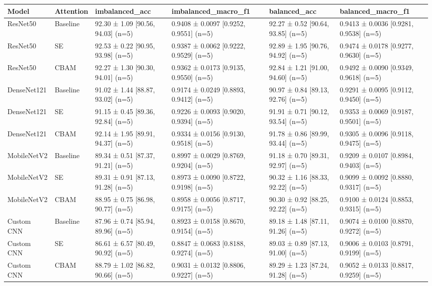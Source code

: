 \begin{tabular}{llllll}
\toprule
Model & Attention & imbalanced\_acc & imbalanced\_macro\_f1 & balanced\_acc & balanced\_macro\_f1 \\
\midrule
ResNet50 & Baseline & 92.30 ± 1.09 [90.56, 94.03] (n=5) & 0.9408 ± 0.0097 [0.9252, 0.9551] (n=5) & 92.27 ± 0.52 [90.64, 93.85] (n=5) & 0.9413 ± 0.0036 [0.9281, 0.9538] (n=5) \\
ResNet50 & SE & 92.53 ± 0.22 [90.95, 93.98] (n=5) & 0.9387 ± 0.0062 [0.9222, 0.9529] (n=5) & 92.89 ± 1.95 [90.76, 94.92] (n=5) & 0.9474 ± 0.0178 [0.9277, 0.9630] (n=5) \\
ResNet50 & CBAM & 92.27 ± 1.30 [90.30, 94.01] (n=5) & 0.9362 ± 0.0173 [0.9135, 0.9550] (n=5) & 92.84 ± 1.21 [91.00, 94.60] (n=5) & 0.9492 ± 0.0090 [0.9349, 0.9618] (n=5) \\
DenseNet121 & Baseline & 91.02 ± 1.44 [88.87, 93.02] (n=5) & 0.9174 ± 0.0249 [0.8893, 0.9412] (n=5) & 90.97 ± 0.84 [89.13, 92.76] (n=5) & 0.9291 ± 0.0095 [0.9112, 0.9450] (n=5) \\
DenseNet121 & SE & 91.15 ± 0.45 [89.36, 92.84] (n=5) & 0.9226 ± 0.0093 [0.9020, 0.9394] (n=5) & 91.91 ± 0.71 [90.12, 93.54] (n=5) & 0.9353 ± 0.0069 [0.9187, 0.9501] (n=5) \\
DenseNet121 & CBAM & 92.14 ± 1.95 [89.91, 94.37] (n=5) & 0.9334 ± 0.0156 [0.9130, 0.9518] (n=5) & 91.78 ± 0.86 [89.99, 93.44] (n=5) & 0.9305 ± 0.0096 [0.9118, 0.9475] (n=5) \\
MobileNetV2 & Baseline & 89.34 ± 0.51 [87.37, 91.21] (n=5) & 0.8997 ± 0.0029 [0.8769, 0.9204] (n=5) & 91.18 ± 0.70 [89.31, 92.97] (n=5) & 0.9209 ± 0.0107 [0.8984, 0.9403] (n=5) \\
MobileNetV2 & SE & 89.31 ± 0.91 [87.13, 91.28] (n=5) & 0.8973 ± 0.0090 [0.8722, 0.9198] (n=5) & 90.32 ± 1.16 [88.33, 92.22] (n=5) & 0.9099 ± 0.0092 [0.8880, 0.9317] (n=5) \\
MobileNetV2 & CBAM & 88.95 ± 0.75 [86.98, 90.77] (n=5) & 0.8958 ± 0.0056 [0.8717, 0.9175] (n=5) & 90.30 ± 0.92 [88.25, 92.22] (n=5) & 0.9100 ± 0.0124 [0.8853, 0.9315] (n=5) \\
Custom CNN & Baseline & 87.96 ± 0.74 [85.94, 89.96] (n=5) & 0.8923 ± 0.0158 [0.8670, 0.9154] (n=5) & 89.18 ± 1.48 [87.11, 91.26] (n=5) & 0.9074 ± 0.0100 [0.8870, 0.9272] (n=5) \\
Custom CNN & SE & 86.61 ± 6.57 [80.49, 90.92] (n=5) & 0.8847 ± 0.0683 [0.8188, 0.9274] (n=5) & 89.03 ± 0.89 [87.13, 91.00] (n=5) & 0.9006 ± 0.0103 [0.8791, 0.9199] (n=5) \\
Custom CNN & CBAM & 88.79 ± 1.02 [86.82, 90.66] (n=5) & 0.9031 ± 0.0132 [0.8806, 0.9227] (n=5) & 89.29 ± 1.23 [87.24, 91.28] (n=5) & 0.9052 ± 0.0133 [0.8817, 0.9259] (n=5) \\
\bottomrule
\end{tabular}
